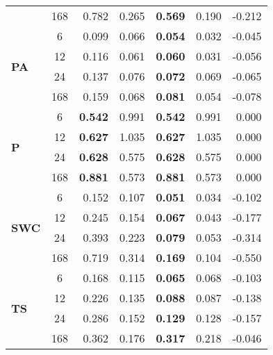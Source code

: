 \begin{table}
\begin{tabular}{p{2.1cm}c|rr|rr|r}
 & 168 & 0.782 & 0.265 & \bfseries 0.569 & 0.190 & -0.212 \\
\cline{1-7}
\multirow[c]{4}{*}{\parbox{2.1cm}{\textbf{PA}}} & 6 & 0.099 & 0.066 & \bfseries 0.054 & 0.032 & -0.045 \\
 & 12 & 0.116 & 0.061 & \bfseries 0.060 & 0.031 & -0.056 \\
 & 24 & 0.137 & 0.076 & \bfseries 0.072 & 0.069 & -0.065 \\
 & 168 & 0.159 & 0.068 & \bfseries 0.081 & 0.054 & -0.078 \\
\cline{1-7}
\multirow[c]{4}{*}{\parbox{2.1cm}{\textbf{P}}} & 6 & \bfseries 0.542 & 0.991 & \bfseries 0.542 & 0.991 & 0.000 \\
 & 12 & \bfseries 0.627 & 1.035 & \bfseries 0.627 & 1.035 & 0.000 \\
 & 24 & \bfseries 0.628 & 0.575 & \bfseries 0.628 & 0.575 & 0.000 \\
 & 168 & \bfseries 0.881 & 0.573 & \bfseries 0.881 & 0.573 & 0.000 \\
\cline{1-7}
\multirow[c]{4}{*}{\parbox{2.1cm}{\textbf{SWC}}} & 6 & 0.152 & 0.107 & \bfseries 0.051 & 0.034 & -0.102 \\
 & 12 & 0.245 & 0.154 & \bfseries 0.067 & 0.043 & -0.177 \\
 & 24 & 0.393 & 0.223 & \bfseries 0.079 & 0.053 & -0.314 \\
 & 168 & 0.719 & 0.314 & \bfseries 0.169 & 0.104 & -0.550 \\
\cline{1-7}
\multirow[c]{4}{*}{\parbox{2.1cm}{\textbf{TS}}} & 6 & 0.168 & 0.115 & \bfseries 0.065 & 0.068 & -0.103 \\
 & 12 & 0.226 & 0.135 & \bfseries 0.088 & 0.087 & -0.138 \\
 & 24 & 0.286 & 0.152 & \bfseries 0.129 & 0.128 & -0.157 \\
 & 168 & 0.362 & 0.176 & \bfseries 0.317 & 0.218 & -0.046 \\
\cline{1-7}
\bottomrule
\end{tabular}
\end{table}
